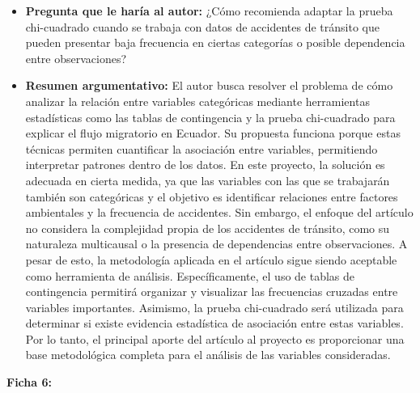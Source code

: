 \documentclass[12pt]{article}
\begin{document}
\begin{itemize}
	\item \textbf{Pregunta que le haría al autor:} ¿Cómo recomienda adaptar la prueba chi-cuadrado cuando se trabaja con datos de accidentes de tránsito que pueden presentar 
    baja frecuencia en ciertas categorías o posible dependencia entre observaciones?
    
	\item \textbf{Resumen argumentativo:} El autor busca resolver el problema de cómo analizar la relación entre variables categóricas mediante herramientas estadísticas 
    como las tablas de contingencia y la prueba chi-cuadrado para explicar el flujo migratorio en Ecuador. Su propuesta funciona porque estas técnicas permiten cuantificar 
    la asociación entre variables, permitiendo interpretar patrones dentro de los datos. En este proyecto, la solución es adecuada en cierta medida, ya que las variables 
    con las que se trabajarán también son categóricas y el objetivo es identificar relaciones entre factores ambientales y la frecuencia de accidentes. Sin embargo, el enfoque 
    del artículo no considera la complejidad propia de los accidentes de tránsito, como su naturaleza multicausal o la presencia de dependencias entre observaciones. A pesar de 
    esto, la metodología aplicada en el artículo sigue siendo aceptable como herramienta de análisis. Específicamente, el uso de tablas de contingencia permitirá organizar y 
    visualizar las frecuencias cruzadas entre variables importantes. Asimismo, la prueba chi-cuadrado será utilizada para determinar si existe evidencia estadística de asociación 
    entre estas variables. Por lo tanto, el principal aporte del artículo al proyecto es proporcionar una base metodológica completa para el análisis de las variables consideradas.\\
\end{itemize} 


\textbf{Ficha 6:}
\end{document}
